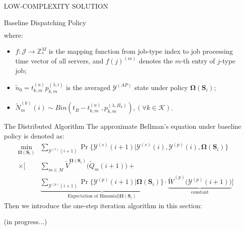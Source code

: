 \documentclass[10pt, conference, letterpaper]{IEEEtran}
\newcommand{\domZ}{\mathbb{Z}_{*}}
\renewcommand{\vec}{\mathbf}
\newcommand{\apSet}{\mathcal{K}}
\newcommand{\esSet}{\mathcal{M}}
\newcommand{\jSpace}{\mathcal{J}}
\newcommand{\Stat}{\mathbf{S}}
\newcommand{\Obsv}{\mathcal{Y}}
\newcommand{\Policy}{\mathbf{\Omega}}
\begin{document}
\begin{section}{LOW-COMPLEXITY SOLUTION}
\begin{subsection}{Baseline Dispatching Policy}
\begin{align}
            \end{align}
            where:
            \begin{itemize}
                \item $f:\jSpace \to \domZ^M$ is the mapping function from job-type index to job processing time vector of all servers, and $f(j)^{(m)}$ denotes the $m$-th entry of $j$-type job;
                \item $\tilde{n}_0 = t^{(u)}_{k,m}p^{(\lambda,i)}_{k,m}$ is the averaged $\Obsv^{(AP)}$ state under policy $\Policy(\Stat_i)$;
                \item $\tilde{N}^{(k)}_m(i) \sim Bin(t_B-t^{(u)}_{k,m}, p^{(\lambda, \Pi_k)}_{k,m}), (\forall k\in\apSet)$.
            \end{itemize}
        \end{subsection}

        \begin{subsection}{The Distributed Algorithm}
            The approximate Bellman's equation under baseline policy is denoted as:
            \begin{align}
                \min_{\Policy(\Stat_i)}& \sum_{\Obsv^{(s)}(i+1)} \Pr\{\Obsv^{(s)}(i+1)|\Obsv^{(s)}(i), \Obsv^{(p)}(i), \Policy(\Stat_i)\}
                \nonumber\\
                \times \bigg[& \sum_{m\in\esSet} \tilde{V}^{\Policy(\Stat_i)}\bigg(\tilde{Q}_m(i+1)\bigg) +
                    \nonumber\\
                    & \underbrace{\sum_{\Obsv^{(p)}(i+1)} \Pr\{\Obsv^{(p)}(i+1)|\Policy(\Stat_i)\}}_{\text{Expectation of Binomial}|\Policy(\Stat_i)}
                    \cdot \underbrace{\tilde{W}^{(p)}\bigg(\Obsv^{(p)}(i+1)\bigg)}_{\text{constant}} \bigg]
            \end{align}
            Then we introduce the one-step iteration algorithm in this section:
            \begin{algorithm}[H]
                \caption{Distributed Algorithm for $k$-th AP}
                \begin{algorithmic}
                    \WHILE{\TRUE}
                        \STATE (in progress...)
                    \ENDWHILE
                \end{algorithmic}
            \end{algorithm}
        \end{subsection}
        
    \end{section}
\end{document}
